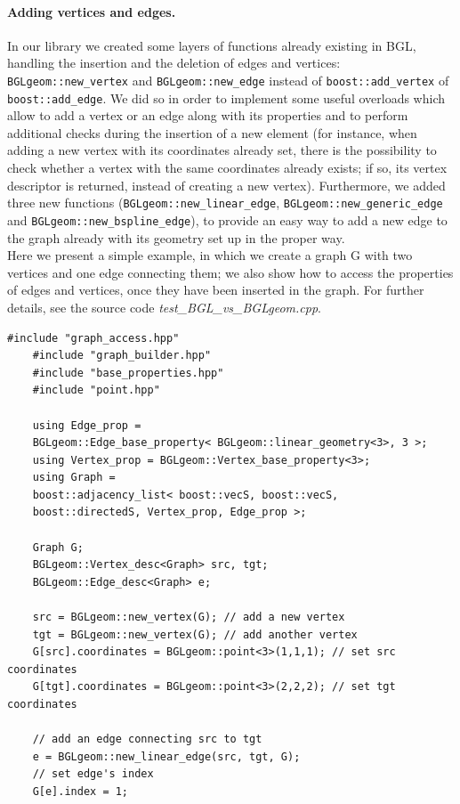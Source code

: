 \documentclass[10pt]{article} %
\begin{document}
	\paragraph{Adding vertices and edges.} In our library we created some layers of functions already existing in BGL, handling the insertion and the deletion of edges and vertices: \texttt{BGLgeom::new\_vertex} and \texttt{BGLgeom::new\_edge} instead of \texttt{boost::add\_vertex} of \texttt{boost::add\_edge}. We did so in order to implement some useful overloads which allow to add a vertex or an edge along with its properties and to perform additional checks during the insertion of a new element (for instance, when adding a new vertex with its coordinates already set, there is the possibility to check whether a vertex with the same coordinates already exists; if so, its vertex descriptor is returned, instead of creating a new vertex). Furthermore, we added three new functions (\texttt{BGLgeom::new\_linear\_edge}, \texttt{BGLgeom::new\_generic\_edge} and \texttt{BGLgeom::new\_bspline\_edge}), to provide an easy way to add a new edge to the graph already with its geometry set up in the proper way.\\
	Here we present a simple example, in which we create a graph G with two vertices and one edge connecting them; we also show how to access the properties of edges and vertices, once they have been inserted in the graph. For further details, see the source code \textit{test\_BGL\_vs\_BGLgeom.cpp}.	
	\begin{lstlisting}[frame=single]
	#include "graph_access.hpp"
	#include "graph_builder.hpp"
	#include "base_properties.hpp"		
	#include "point.hpp"
	
	using Edge_prop = 
	BGLgeom::Edge_base_property< BGLgeom::linear_geometry<3>, 3 >;
	using Vertex_prop = BGLgeom::Vertex_base_property<3>;
	using Graph = 
	boost::adjacency_list< boost::vecS, boost::vecS, 
	boost::directedS, Vertex_prop, Edge_prop >;
	
	Graph G;
	BGLgeom::Vertex_desc<Graph> src, tgt;
	BGLgeom::Edge_desc<Graph> e;
	
	src = BGLgeom::new_vertex(G); // add a new vertex 
	tgt = BGLgeom::new_vertex(G); // add another vertex
	G[src].coordinates = BGLgeom::point<3>(1,1,1); // set src coordinates
	G[tgt].coordinates = BGLgeom::point<3>(2,2,2); // set tgt coordinates
	
	// add an edge connecting src to tgt
	e = BGLgeom::new_linear_edge(src, tgt, G);
	// set edge's index	
	G[e].index = 1;
	\end{lstlisting}
	
\end{document}
